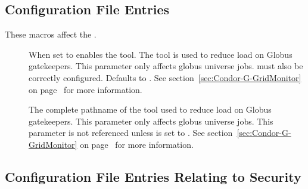 \subsection{\label{sec:GridMonitor-Config-File-Entries}
 Configuration File Entries}

These macros affect the .
\begin{description}

\item[] \label{param:EnableGridMonitor}
  When set to  enables the  tool.  The
   tool is used to reduce load on Globus gatekeepers.
  This parameter only affects globus universe jobs.
   must also be correctly configured.
  Defaults to .
  See section~\ref{sec:Condor-G-GridMonitor} on
  page~\pageref{sec:Condor-G-GridMonitor}
  for more information.

\item[] \label{param:GridMonitor}
  The complete pathname of the  tool used to reduce load on
  Globus gatekeepers.  This parameter only affects globus
  universe jobs.  This parameter is not referenced unless
   is set to . 
  See section~\ref{sec:Condor-G-GridMonitor} on
  page~\pageref{sec:Condor-G-GridMonitor}
  for more information.

\end{description}




\subsection{\label{sec:Security-Config-File-Entries}
Configuration File Entries Relating to Security}

